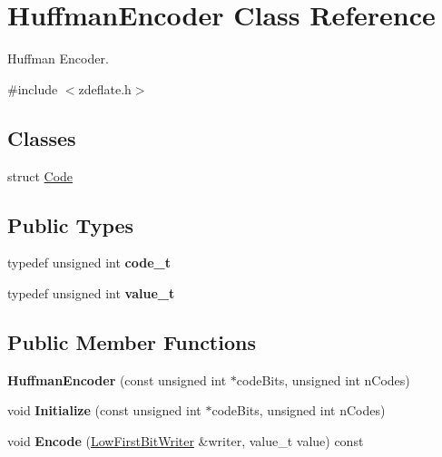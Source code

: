 \hypertarget{class_huffman_encoder}{
\section{HuffmanEncoder Class Reference}
\label{class_huffman_encoder}
}


Huffman Encoder.  


{\ttfamily \#include $<$zdeflate.h$>$}\subsection*{Classes}
\begin{DoxyCompactItemize}
\item 
struct \hyperlink{struct_huffman_encoder_1_1_code}{Code}
\end{DoxyCompactItemize}
\subsection*{Public Types}
\begin{DoxyCompactItemize}
\item 
\hypertarget{class_huffman_encoder_a61375c364cc2b5f0d3b877afe8762606}{
typedef unsigned int {\bfseries code\_\-t}}
\label{class_huffman_encoder_a61375c364cc2b5f0d3b877afe8762606}

\item 
\hypertarget{class_huffman_encoder_a434191dc5346a9c25a2365bc7da564ad}{
typedef unsigned int {\bfseries value\_\-t}}
\label{class_huffman_encoder_a434191dc5346a9c25a2365bc7da564ad}

\end{DoxyCompactItemize}
\subsection*{Public Member Functions}
\begin{DoxyCompactItemize}
\item 
\hypertarget{class_huffman_encoder_af646f8a57a3fae0ff8c2e8ff27d8db87}{
{\bfseries HuffmanEncoder} (const unsigned int $\ast$codeBits, unsigned int nCodes)}
\label{class_huffman_encoder_af646f8a57a3fae0ff8c2e8ff27d8db87}

\item 
\hypertarget{class_huffman_encoder_a58cdf24aadeaea994f01164e7dea0a3d}{
void {\bfseries Initialize} (const unsigned int $\ast$codeBits, unsigned int nCodes)}
\label{class_huffman_encoder_a58cdf24aadeaea994f01164e7dea0a3d}

\item 
\hypertarget{class_huffman_encoder_a32d5acf1928d57fcd5bdb1b7f7a76f29}{
void {\bfseries Encode} (\hyperlink{class_low_first_bit_writer}{LowFirstBitWriter} \&writer, value\_\-t value) const }
\label{class_huffman_encoder_a32d5acf1928d57fcd5bdb1b7f7a76f29}

\end{DoxyCompactItemize}

